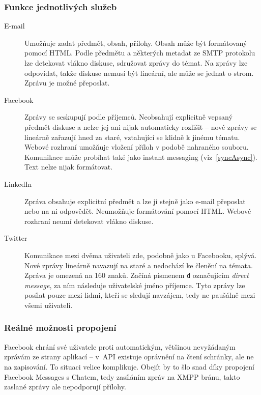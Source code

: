 \documentclass[12pt,oneside,final]{fithesis2}
\begin{document}
\subsubsection*{Funkce jednotlivých služeb}
\begin{description}
    \item[E-mail]
        Umožňuje zadat předmět, obsah, přílohy. Obsah může být formátovaný pomocí HTML. Podle předmětu a některých metadat ze SMTP protokolu lze detekovat vlákno diskuse, sdružovat zprávy do témat. Na zprávy lze odpovídat, takže diskuse nemusí být lineární, ale může se jednat o strom. Zprávu je možné přeposlat.

    \item[Facebook]
        Zprávy se seskupují podle příjemců. Neobsahují explicitně vepsaný předmět diskuse a nelze jej ani nijak automaticky rozlišit -- nové zprávy se lineárně zařazují hned za staré, vztahující se klidně k jinému tématu. Webové rozhraní umožňuje vložení příloh v podobě nahraného souboru. Komunikace může probíhat také jako instant messaging (viz~\ref{syncAsync}). Text nelze nijak formátovat.

    \item[LinkedIn]
        Zpráva obsahuje explicitní předmět a lze ji stejně jako e-mail přeposlat nebo na ni odpovědět. Neumožňuje formátování pomocí HTML. Webové rozhraní neumí detekovat vlákno diskuse.

    \item[Twitter]
        Komunikace mezi dvěma uživateli zde, podobně jako u Facebooku, splývá. Nové zprávy lineárně navazují na staré a nedochází ke členění na témata. Zpráva je omezená na 160 znaků. Začíná písmenem {\tt d} označujícím \emph{direct message}, za ním následuje uživatelské jméno příjemce. Tyto zprávy lze posílat pouze mezi lidmi, kteří se sledují navzájem, tedy ne paušálně mezi všemi uživateli.
\end{description}

\subsubsection*{Reálné možnosti propojení}
Facebook chrání své uživatele proti automatickým, většinou nevyžádaným zprávám ze strany aplikací -- v~API existuje oprávnění na čtení schránky, ale ne na zapisování. To situaci velice komplikuje. Obejít by to šlo snad díky propojení Facebook Messages s Chatem, tedy zasíláním zpráv na XMPP bránu, takto zaslané zprávy ale nepodporují přílohy.
\end{document}
